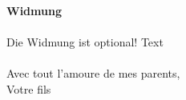 \newpage
\printindex

\newpage
{}
\textbf{\LARGE Widmung}\\\\
Die Widmung ist optional!
Text\\\\

Avec tout l'amoure de mes parents,\\ 
Votre fils


